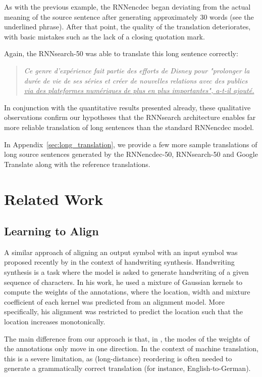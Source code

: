 As with the previous example, the RNNencdec began deviating from the actual meaning
of the source sentence after generating approximately 30 words (see the
underlined phrase). After that point, the quality of the translation
deteriorates, with basic mistakes such as the lack of a closing quotation mark.

Again, the RNNsearch-50 was able to translate this long sentence correctly:
\begin{quote}
{    \it
Ce genre d'exp\'erience fait partie des efforts de Disney pour "prolonger la
dur\'ee de vie de ses s\'eries et cr\'eer de nouvelles relations avec des
publics \uline{via des plateformes num\'eriques de plus en plus importantes", a-t-il
ajout\'e.} }
\end{quote}

In conjunction with the quantitative results presented already, these
qualitative observations confirm our hypotheses that the RNNsearch architecture
enables far more reliable translation of long sentences than the standard RNNencdec
model. 

In Appendix~\ref{sec:long_translation}, we provide a few more sample
translations of long source sentences generated by the RNNencdec-50, RNNsearch-50
and Google Translate along with the reference translations.

\section{Related Work}

\subsection{Learning to Align}

A similar approach of aligning an output symbol with an input symbol was
proposed recently by \citet{Graves2013} in the context of handwriting synthesis.
Handwriting synthesis is a task where the model is asked to generate handwriting
of a given sequence of characters. In his work, he used a mixture of Gaussian
kernels to compute the weights of the annotations, where the location, width and
mixture coefficient of each kernel was predicted from an alignment model. More
specifically, his alignment was restricted to predict the location such that the
location increases monotonically.

The main difference from our approach is that, in \citep{Graves2013}, the modes
of the weights of the annotations only move in one direction. In the context of
machine translation, this is a severe limitation, as (long-distance) reordering
is often needed to generate a grammatically correct translation (for instance,
English-to-German).

